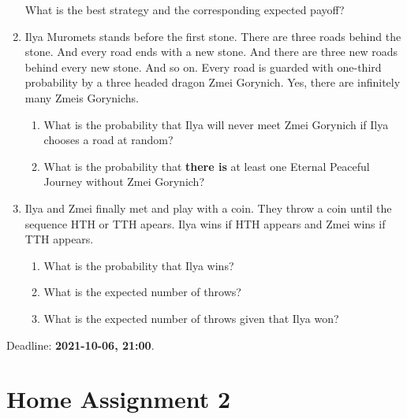 \documentclass[12pt]{article}
\begin{document}
\begin{enumerate}
  What is the best strategy and the corresponding expected payoff?

\item Ilya Muromets stands before the first stone. There are three roads behind the stone. 
And every road ends with a new stone. And there are three new roads behind every new stone. And so on. 
Every road is guarded with one-third probability by a three headed dragon Zmei Gorynich.
Yes, there are infinitely many Zmeis Gorynichs.

\begin{enumerate}
\item What is the probability that Ilya will never meet Zmei Gorynich if Ilya chooses a road at random?
\item What is the probability that \textbf{there is} at least one Eternal Peaceful Journey without Zmei Gorynich?
\end{enumerate}

\item Ilya and Zmei finally met and play with a coin. 
They throw a coin until the sequence HTH or TTH apears. 
Ilya wins if HTH appears and Zmei wins if TTH appears.

\begin{enumerate}
  \item What is the probability that Ilya wins?
  \item What is the expected number of throws?
  \item What is the expected number of throws given that Ilya won?
\end{enumerate}

\end{enumerate}

Deadline: \textbf{2021-10-06, 21:00}. 


\section*{Home Assignment 2}
\end{document}
